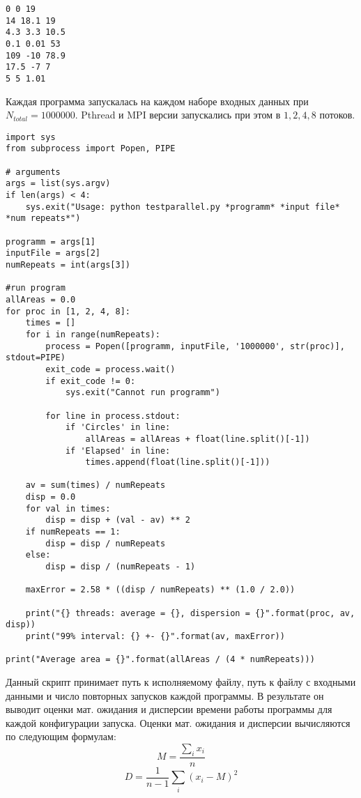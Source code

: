 \begin{lstlisting}[caption={Набор данных 3}, label={lst:input1}, style=crs_cpp]
0 0 19
14 18.1 19
4.3 3.3 10.5
0.1 0.01 53
109 -10 78.9
17.5 -7 7
5 5 1.01
\end{lstlisting}

Каждая программа запускалась на каждом наборе входных данных при $N_{total} = 1000000$. Pthread и MPI версии запускались при этом в $1, 2, 4, 8$ потоков.
\begin{lstlisting}[caption={Скрипт запуска}, label={lst:script}, style=crs_python]
import sys
from subprocess import Popen, PIPE

# arguments
args = list(sys.argv)
if len(args) < 4:
	sys.exit("Usage: python testparallel.py *programm* *input file* *num repeats*")

programm = args[1]
inputFile = args[2]
numRepeats = int(args[3])

#run program
allAreas = 0.0
for proc in [1, 2, 4, 8]:
	times = []
	for i in range(numRepeats):
		process = Popen([programm, inputFile, '1000000', str(proc)], stdout=PIPE)
		exit_code = process.wait()
		if exit_code != 0:
			sys.exit("Cannot run programm")

		for line in process.stdout:
			if 'Circles' in line:
				allAreas = allAreas + float(line.split()[-1])
			if 'Elapsed' in line:
				times.append(float(line.split()[-1]))

	av = sum(times) / numRepeats
	disp = 0.0
	for val in times:
		disp = disp + (val - av) ** 2
	if numRepeats == 1:
		disp = disp / numRepeats
	else:
		disp = disp / (numRepeats - 1)

	maxError = 2.58 * ((disp / numRepeats) ** (1.0 / 2.0))

	print("{} threads: average = {}, dispersion = {}".format(proc, av, disp))
	print("99% interval: {} +- {}".format(av, maxError))

print("Average area = {}".format(allAreas / (4 * numRepeats)))
\end{lstlisting}

Данный скрипт принимает путь к исполняемому файлу, путь к файлу с входными данными и число повторных запусков каждой программы. В результате он выводит оценки мат. ожидания и дисперсии времени работы программы для каждой конфигурации запуска. Оценки мат. ожидания и дисперсии вычисляются по следующим формулам:
\begin{equation*}
M=\frac{\sum_{i}{x_i}}{n}
\end{equation*}
\begin{equation*}
D=\frac{1}{n - 1} {\sum_{i}{(x_i - M)^2}}
\end{equation*}

